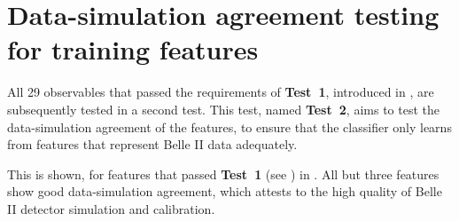 \chapter{Data-simulation agreement testing for \texorpdfstring{\BDT}{BDT} training features}\label{sec:appendix_continuum_features_datamc}

All 29 observables that passed the requirements of \textbf{Test~1}, introduced in , are subsequently tested in a second test.
This test, named \textbf{Test~2}, aims to test the data-simulation agreement of the features, to ensure that the classifier only learns from features that represent Belle II data adequately.

This is shown, for features that passed \textbf{Test~1} (see ) in .
All but three features show good data-simulation agreement, which attests to the high quality of Belle II detector simulation and calibration.

